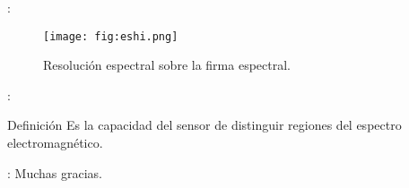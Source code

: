 \begin{frame}{\secname : \subsecname}
  \begin{figure}
    \centering
    \texttt{[image: fig:eshi.png]}
    \caption{Resolución espectral sobre la firma espectral.}
    \label{}
  \end{figure}
\end{frame}

\begin{frame}{\secname : \subsecname}
    \begin{block}{Definición}
        Es la capacidad del sensor de distinguir regiones del espectro electromagnético.
    \end{block}
\end{frame}








\begin{frame}{\secname : \subsecname}
Muchas gracias.
\end{frame}

